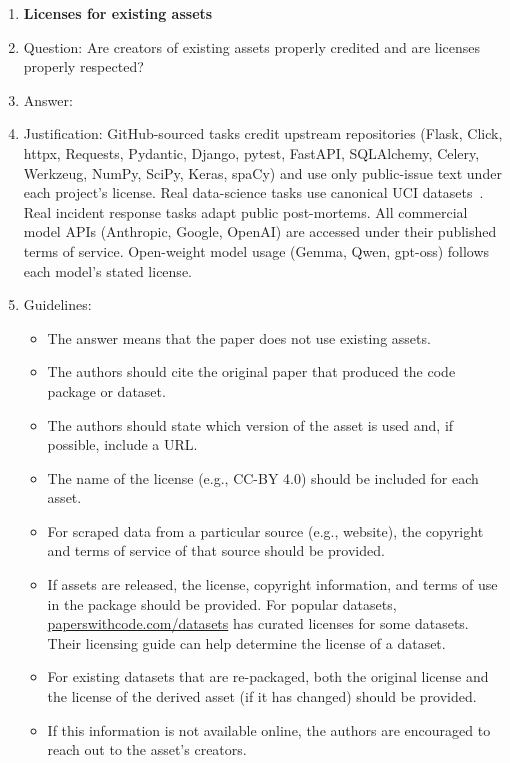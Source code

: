 \begin{enumerate}
\item {\bf Licenses for existing assets}
    \item[] Question: Are creators of existing assets properly credited and are licenses properly respected?
    \item[] Answer: \answerYes{}
    \item[] Justification: GitHub-sourced tasks credit upstream repositories (Flask, Click, httpx, Requests, Pydantic, Django, pytest, FastAPI, SQLAlchemy, Celery, Werkzeug, NumPy, SciPy, Keras, spaCy) and use only public-issue text under each project's license. Real data-science tasks use canonical UCI datasets~\citep{dua2019uci}. Real incident response tasks adapt public post-mortems. All commercial model APIs (Anthropic, Google, OpenAI) are accessed under their published terms of service. Open-weight model usage (Gemma, Qwen, gpt-oss) follows each model's stated license.
    \item[] Guidelines:
    \begin{itemize}
        \item The answer \answerNA{} means that the paper does not use existing assets.
        \item The authors should cite the original paper that produced the code package or dataset.
        \item The authors should state which version of the asset is used and, if possible, include a URL.
        \item The name of the license (e.g., CC-BY 4.0) should be included for each asset.
        \item For scraped data from a particular source (e.g., website), the copyright and terms of service of that source should be provided.
        \item If assets are released, the license, copyright information, and terms of use in the package should be provided. For popular datasets, \url{paperswithcode.com/datasets} has curated licenses for some datasets. Their licensing guide can help determine the license of a dataset.
        \item For existing datasets that are re-packaged, both the original license and the license of the derived asset (if it has changed) should be provided.
        \item If this information is not available online, the authors are encouraged to reach out to the asset's creators.
    \end{itemize}


\end{enumerate}
